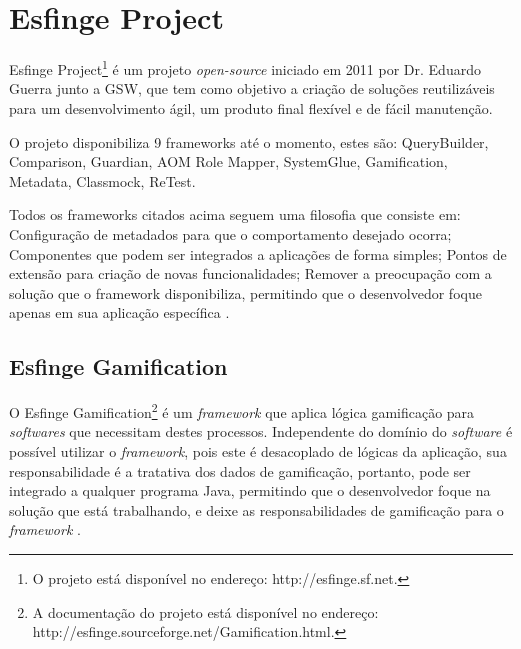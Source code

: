 \section{Esfinge Project}

\par Esfinge Project\footnote{O projeto está disponível no endereço: http://esfinge.sf.net.} é um projeto \textit{open-source} iniciado em 2011 por Dr. Eduardo Guerra junto a GSW, que tem como objetivo a criação de soluções reutilizáveis para um desenvolvimento ágil, um produto final flexível e de fácil manutenção.
\par O projeto disponibiliza 9 frameworks até o momento, estes são: QueryBuilder, Comparison, Guardian, AOM Role Mapper, SystemGlue, Gamification, Metadata, Classmock, ReTest.
\par Todos os frameworks citados acima seguem uma filosofia que consiste em: Configuração de metadados para que o comportamento desejado ocorra; Componentes que podem ser integrados a aplicações de forma simples; Pontos de extensão para criação de novas funcionalidades; Remover a preocupação com a solução que o framework disponibiliza, permitindo que o desenvolvedor foque apenas em sua aplicação específica .

\subsection{Esfinge Gamification}

\par O Esfinge Gamification\footnote{A documentação do projeto está disponível no endereço: http://esfinge.sourceforge.net/Gamification.html.} é um \textit{framework} que aplica lógica gamificação para \textit{softwares} que necessitam destes processos. Independente do domínio do \textit{software} é possível utilizar o \textit{framework}, pois este é desacoplado de lógicas da aplicação, sua responsabilidade é a tratativa dos dados de gamificação, portanto, pode ser integrado a qualquer programa Java, permitindo que o desenvolvedor foque na solução que está trabalhando, e deixe as responsabilidades de gamificação para o \textit{framework}  .


